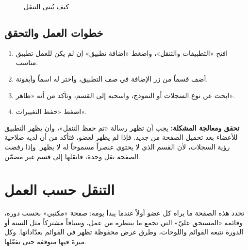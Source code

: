 \begin{figure}[H]
\centering
{}
\rclegend
\caption{كيف يُبنى التنقل}
\label{fig:builder-navigation-tree}
\end{figure}

\subsection{خطوات العمل والتحقق}
\begin{enumerate}
\item افتح «التطبيقات والتنقل»، واضغط «إضافة تطبيق» إن لم يكن للعمل تطبيق مناسب.
\item أضف قسماً من زر الإضافة في صف التطبيق، واختر له اسماً وأيقونة.
\item ابحث عن نوع السجلات أو النموذج، واسحبه إلى القسم، وتأكد من أنه «ظاهر».
\item اضغط «حفظ التغييرات».
\end{enumerate}

\textbf{تحقق ومعالجة المشكلة:} يجب أن تظهر رسالة «تم حفظ التنقل»، وأن يظهر التطبيق للأعضاء بعد تحميل الصفحة من جديد. فإذا لم يظهر لعضو، فتأكد من أن لديه صلاحية رؤية السجلات، لأن القسم الذي لا يحتوي عنصراً مسموحاً له لا يظهر. وإذا رفضت الصفحة نقل وحدة، فانقلها إلى قسم غير مضمّن.

\clearpage
\section{التنقل حسب العمل}
\label{sec:builder-feature-work-navigation}

تحدد هذه الصفحة ما يراه كل عضو أولاً عندما يبدأ يومه: صفحة «مكتبي» بحسب دوره، وقائمة «المستحق عليّ» التي تجمع ما ينتظره من عمل، وسياقاً مشتركاً مثل السنة أو الدورة تتبعه القوائم واللوحات، وطرق عرض محفوظة تظهر في القوائم بعدّاداتها. وكل ميزة فيها متوقفة حتى تفعّلها.

